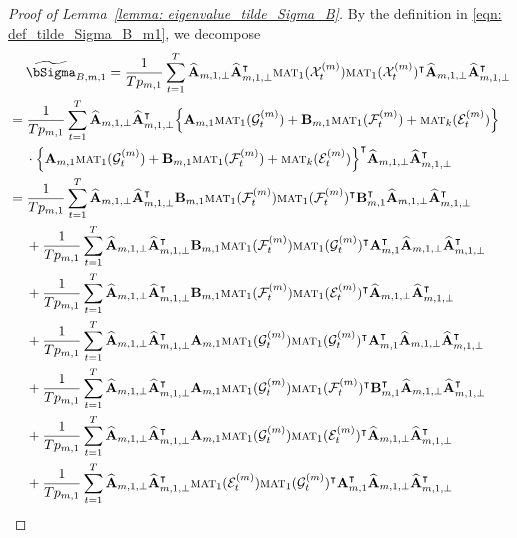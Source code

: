 \documentclass[aos]{imsart}
\theoremstyle{plain}
\theoremstyle{definition}
\def\mat{\textnormal{\textsc{mat}}}
\def\wt#1{\widetilde{#1}}
\def\wh#1{\widehat{#1}}
\def\cE{\mathcal{E}}
\def\cF{\mathcal{F}}
\def\cG{\mathcal{G}} \def\cH{\boldsymbol{\mathcal{H}}} \def\cI{\mathcal{I}}
\def\cX{\mathcal{X}}
\def\bA{\mathbf{A}}
\def\bB{\mathbf{B}}
\def\trans{\intercal}
\begin{document}
\begin{proof}[Proof of Lemma~\ref{lemma: eigenvalue_tilde_Sigma_B}]
By the definition in \eqref{eqn: def_tilde_Sigma_B_m1}, we decompose
\begin{align}
    &\;\quad
    \wt\bSigma_{B,m,1} = \frac{1}{Tp_{m,1}} \sum_{t=1}^T \wh{\bA}_{m,1,\perp} \wh{\bA}_{m,1,\perp}^\trans \mat_1(\cX_t^{(m)}) \mat_1(\cX_t^{(m)})^\trans \wh{\bA}_{m,1,\perp} \wh{\bA}_{m,1,\perp}^\trans \notag \\
    &=
    \frac{1}{Tp_{m,1}} \sum_{t=1}^T \wh{\bA}_{m,1,\perp} \wh{\bA}_{m,1,\perp}^\trans \Big\{ \bA_{m,1} \mat_1(\cG_t^{(m)}) + \bB_{m,1} \mat_1(\cF_t^{(m)}) + \mat_k(\cE_t^{(m)}) \Big\} \notag \\
    &\;\quad
    \cdot \Big\{ \bA_{m,1} \mat_1(\cG_t^{(m)}) + \bB_{m,1} \mat_1(\cF_t^{(m)}) + \mat_k(\cE_t^{(m)}) \Big\}^\trans \wh{\bA}_{m,1,\perp} \wh{\bA}_{m,1,\perp}^\trans \notag \\
    &=
    \frac{1}{Tp_{m,1}} \sum_{t=1}^T \wh{\bA}_{m,1,\perp} \wh{\bA}_{m,1,\perp}^\trans \bB_{m,1} \mat_1(\cF_t^{(m)}) \mat_1(\cF_t^{(m)})^\trans \bB_{m,1}^\trans \wh{\bA}_{m,1,\perp} \wh{\bA}_{m,1,\perp}^\trans \notag \\
    &\;\quad
    + \frac{1}{Tp_{m,1}} \sum_{t=1}^T \wh{\bA}_{m,1,\perp} \wh{\bA}_{m,1,\perp}^\trans \bB_{m,1} \mat_1(\cF_t^{(m)}) \mat_1(\cG_t^{(m)})^\trans \bA_{m,1}^\trans \wh{\bA}_{m,1,\perp} \wh{\bA}_{m,1,\perp}^\trans \notag \\
    &\;\quad
    + \frac{1}{Tp_{m,1}} \sum_{t=1}^T \wh{\bA}_{m,1,\perp} \wh{\bA}_{m,1,\perp}^\trans \bB_{m,1} \mat_1(\cF_t^{(m)}) \mat_1(\cE_t^{(m)})^\trans \wh{\bA}_{m,1,\perp} \wh{\bA}_{m,1,\perp}^\trans \notag \\
    &\;\quad
    + \frac{1}{Tp_{m,1}} \sum_{t=1}^T \wh{\bA}_{m,1,\perp} \wh{\bA}_{m,1,\perp}^\trans \bA_{m,1} \mat_1(\cG_t^{(m)}) \mat_1(\cG_t^{(m)})^\trans \bA_{m,1}^\trans \wh{\bA}_{m,1,\perp} \wh{\bA}_{m,1,\perp}^\trans \notag \\
    &\;\quad
    + \frac{1}{Tp_{m,1}} \sum_{t=1}^T \wh{\bA}_{m,1,\perp} \wh{\bA}_{m,1,\perp}^\trans \bA_{m,1} \mat_1(\cG_t^{(m)}) \mat_1(\cF_t^{(m)})^\trans \bB_{m,1}^\trans \wh{\bA}_{m,1,\perp} \wh{\bA}_{m,1,\perp}^\trans \notag \\
    &\;\quad
    + \frac{1}{Tp_{m,1}} \sum_{t=1}^T \wh{\bA}_{m,1,\perp} \wh{\bA}_{m,1,\perp}^\trans \bA_{m,1} \mat_1(\cG_t^{(m)}) \mat_1(\cE_t^{(m)})^\trans \wh{\bA}_{m,1,\perp} \wh{\bA}_{m,1,\perp}^\trans \notag \\
    &\;\quad
    + \frac{1}{Tp_{m,1}} \sum_{t=1}^T \wh{\bA}_{m,1,\perp} \wh{\bA}_{m,1,\perp}^\trans \mat_1(\cE_t^{(m)}) \mat_1(\cG_t^{(m)})^\trans \bA_{m,1}^\trans \wh{\bA}_{m,1,\perp} \wh{\bA}_{m,1,\perp}^\trans \notag \\

\end{align}
\end{proof}
\end{document}
